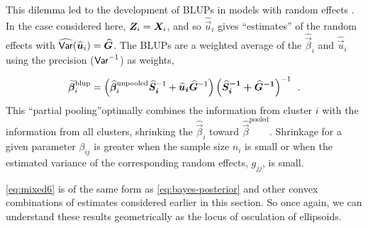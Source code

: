 This dilemma led to the development of BLUPs in models with random effects \citep{Henderson:1975,Robinson:1991,Speed:1991}.
In the case considered here, $\bm{Z}_i = \bm{X}_i$, and so $\widehat{\vec{u}}_i$ gives ``estimates'' of the random effects with
$\widehat{\mathsf{Var}} (\widehat{\bm{u}}_i) = \widehat{\bm{G}}$. The BLUPs are a weighted average of the $\widehat{\vec{\beta}}_i$
and $\widehat{\vec{u}}_i$ using the precision ($\mathsf{Var}^{-1}$) as weights,

\begin{equation}\label{eq:mixed6}
 \widetilde{\bm{\beta}}^{\textrm{blup}}_i =
 \left(
   \widehat{\bm{\beta}}^{\textrm{unpooled}}_i \bm{\widehat{\bm{S}}_i}^{-1}  + \bm{\widehat{\bm{u}}_i \widehat{\bm{G}}}^{-1}
 \right)
 \bm{ \left( \bm{\widehat{\bm{S}}_i}^{-1} + \bm{\widehat{\bm{G}}}^{-1} \right) }^{-1} \:\: .
\end{equation}
This ``partial pooling''optimally combines the information from cluster $i$ with the information from all clusters,
shrinking the $\widehat{\vec{\beta}}_i$ toward $\widehat{\vec{\beta}}^{\textrm{pooled}}$. Shrinkage
for a given parameter $\beta_{ij}$ is greater
when the sample size $n_i$ is small or when the estimated variance of the corresponding random effects, $g_{jj}$, is small.

\eqref{eq:mixed6}
is of the same form as \eqref{eq:bayes-posterior} and other convex combinations of estimates considered
earlier in this section. So once again, we can understand these results geometrically as the locus of
osculation of ellipsoids.


